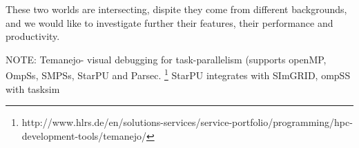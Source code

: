 These two worlds are intersecting, dispite they come from different backgrounds, and we would like to investigate further their features, their performance and
productivity.


NOTE: Temanejo- visual debugging for task-parallelism (supports openMP, OmpSs, SMPSs, StarPU and Parsec. \footnote{http://www.hlrs.de/en/solutions-services/service-portfolio/programming/hpc-development-tools/temanejo/}
StarPU integrates with SImGRID, ompSS with tasksim


